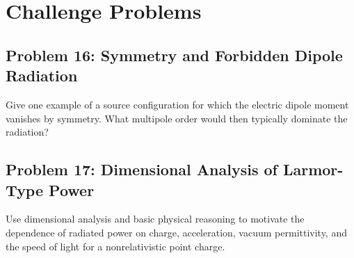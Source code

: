\documentclass[hidelinks]{article}
\begin{document}
\section{Challenge Problems}
\subsection{Problem 16: Symmetry and Forbidden Dipole Radiation}
Give one example of a source configuration for which the electric dipole moment vanishes by symmetry. What multipole order would then typically dominate the radiation?

\subsection{Problem 17: Dimensional Analysis of Larmor-Type Power}
Use dimensional analysis and basic physical reasoning to motivate the dependence of radiated power on charge, acceleration, vacuum permittivity, and the speed of light for a nonrelativistic point charge.
\end{document}

